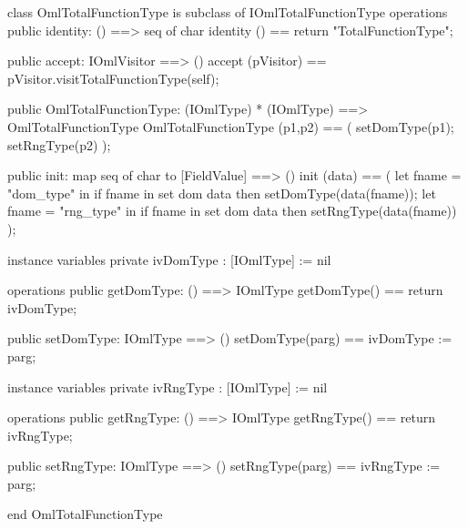 \begin{vdm_al}
class OmlTotalFunctionType is subclass of IOmlTotalFunctionType
operations
  public identity: () ==> seq of char
  identity () == return "TotalFunctionType";

  public accept: IOmlVisitor ==> ()
  accept (pVisitor) == pVisitor.visitTotalFunctionType(self);

  public OmlTotalFunctionType:
      (IOmlType) *
      (IOmlType) ==> OmlTotalFunctionType
  OmlTotalFunctionType (p1,p2) == 
   ( setDomType(p1);
     setRngType(p2) );

  public init: map seq of char to [FieldValue] ==> ()
  init (data) ==
    ( let fname = "dom_type" in
        if fname in set dom data
        then setDomType(data(fname));
      let fname = "rng_type" in
        if fname in set dom data
        then setRngType(data(fname)) );

instance variables
  private ivDomType : [IOmlType] := nil

operations
  public getDomType: () ==> IOmlType
  getDomType() == return ivDomType;

  public setDomType: IOmlType ==> ()
  setDomType(parg) == ivDomType := parg;

instance variables
  private ivRngType : [IOmlType] := nil

operations
  public getRngType: () ==> IOmlType
  getRngType() == return ivRngType;

  public setRngType: IOmlType ==> ()
  setRngType(parg) == ivRngType := parg;

end OmlTotalFunctionType
\end{vdm_al}

